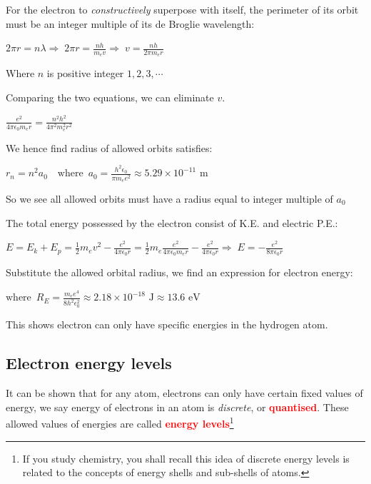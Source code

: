 \documentclass[a4paper,12pt]{book}
\newcommand{\keypoint}[1]{\textbf{\textcolor{red}{#1}}}
\newcommand{\ec}{4\pi\epsilon_0}
\newcommand{\RA}{\Rightarrow\;}
\newcommand{\tcbhighmath}[1]{\boxed{#1}}
\newcommand{\keypoint}[1]{\textbf{\textcolor{red}{#1}}}
\begin{document}
For the electron to \emph{constructively} superpose with itself, the perimeter of its orbit must be an integer multiple of its de Broglie wavelength:

{
	
	\centering
	
	$2\pi r  = n \lambda \RA 2\pi r = \frac{nh}{m_e v} \RA v = \frac{nh}{2\pi m_e r}$
	
}

\noindent Where $n$ is positive integer $1,2,3,\cdots$

Comparing the two equations, we can eliminate $v$.

{
	
	\centering
	
	$\frac{e^2}{\ec m_e r} = \frac{n^2 h^2}{4\pi^2 m_e^2 r^2}$
	
}

We hence find radius of allowed orbits satisfies:

{
	
	\centering
	
	$\boxed{r_n = n^2 a_0} \quad \text{where }\, a_0 = \frac{h^2 \epsilon_0}{\pi m_e e^2} \approx 5.29 \times 10^{-11} \text{ m}$
	
}

\noindent So we see all allowed orbits must have a radius equal to integer multiple of $a_0$

The total energy possessed by the electron consist of K.E. and electric P.E.:

{
	
	\centering
	
	$E = E_k + E_p = \frac{1}{2}m_e v^2 - \frac{e^2}{\ec r} = \frac{1}{2}m_e \frac{e^2}{\ec m_e r} - \frac{e^2}{\ec r} \RA E = -\frac{e^2}{8\pi\epsilon_0 r}$
	
}

Substitute the allowed orbital radius, we find an expression for electron energy:

{
	
	\centering
	
	 $\text{where }\, R_E = \frac{m_e e^4}{8 h^2 \epsilon_0^2} \approx 2.18\times10^{-18} \text{ J} \approx 13.6 \text{ eV}$
	
}

This shows electron can only have specific energies in the hydrogen atom.

\subsection{Electron energy levels}
It can be shown that for any atom, electrons can only have certain fixed values of energy, we say energy of electrons in an atom is \emph{discrete}, or \keypoint{quantised}. These allowed values of energies are called \keypoint{energy levels}\footnote[][-3cm]{If you study chemistry, you shall recall this idea of discrete energy levels is related to the concepts of energy shells and sub-shells of atoms.}
\end{document}
